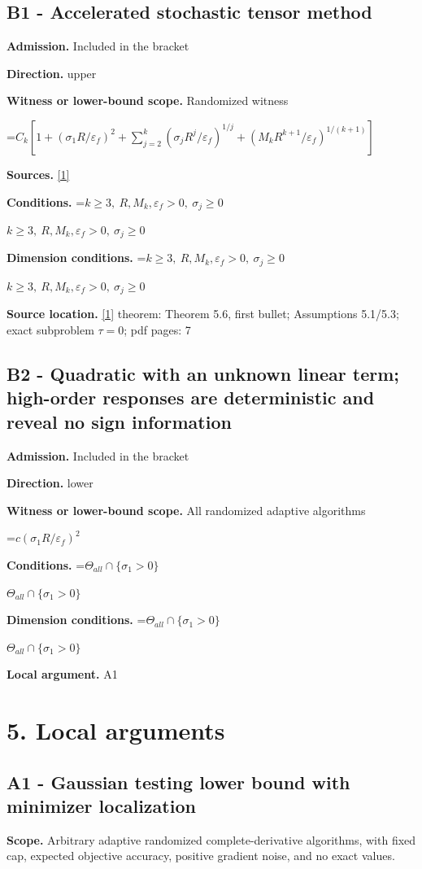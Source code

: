 \documentclass[10pt,a4paper]{article}
\newcommand{\AtlasMath}[1]{\par\begingroup\centering\setbox0=\hbox{$\displaystyle #1$}\ifdim\wd0>1.4\linewidth\typeout{ATLAS WIDE FORMULA: \the\wd0}\fi\ifdim\wd0>\linewidth\resizebox{\linewidth}{!}{\box0}\else\box0\fi\par\endgroup}
\newcommand{\AtlasInlineMath}[1]{\begingroup\setbox0=\hbox{$#1$}\ifdim\wd0>.4\linewidth\endgroup\AtlasMath{#1}\else\endgroup$#1$\fi}
\begin{document}
\subsection{B1 - Accelerated stochastic tensor method}
\textbf{Admission.} Included in the bracket

\textbf{Direction.} upper

\textbf{Witness or lower-bound scope.} Randomized witness

\AtlasMath{C_k[1+(\sigma_1R/\varepsilon_f)^2+\sum_{j=2}^k(\sigma_jR^j/\varepsilon_f)^{1/j}+(M_kR^{k+1}/\varepsilon_f)^{1/(k+1)}]}
\textbf{Sources.} \href{https://arxiv.org/pdf/2309.01570v3}{[1]}

\textbf{Conditions.} \AtlasInlineMath{k\ge3,\ R,M_k,\varepsilon_f>0,\ \sigma_j\ge0}

\textbf{Dimension conditions.} \AtlasInlineMath{k\ge3,\ R,M_k,\varepsilon_f>0,\ \sigma_j\ge0}

\textbf{Source location.} \href{https://arxiv.org/pdf/2309.01570v3}{[1]} theorem: Theorem 5.6, first bullet; Assumptions 5.1/5.3; exact subproblem $\tau =0$; pdf pages: 7

\subsection{B2 - Quadratic with an unknown linear term; high-order responses are deterministic and reveal no sign information}
\textbf{Admission.} Included in the bracket

\textbf{Direction.} lower

\textbf{Witness or lower-bound scope.} All randomized adaptive algorithms

\AtlasMath{c(\sigma_1R/\varepsilon_f)^2}
\textbf{Conditions.} \AtlasInlineMath{\Theta_{all}\cap\{\sigma_1>0\}}

\textbf{Dimension conditions.} \AtlasInlineMath{\Theta_{all}\cap\{\sigma_1>0\}}

\textbf{Local argument.} A1

\section{5. Local arguments}
\subsection{A1 - Gaussian testing lower bound with minimizer localization}
\textbf{Scope.} Arbitrary adaptive randomized complete-derivative algorithms, with fixed cap, expected objective accuracy, positive gradient noise, and no exact values.
\end{document}
